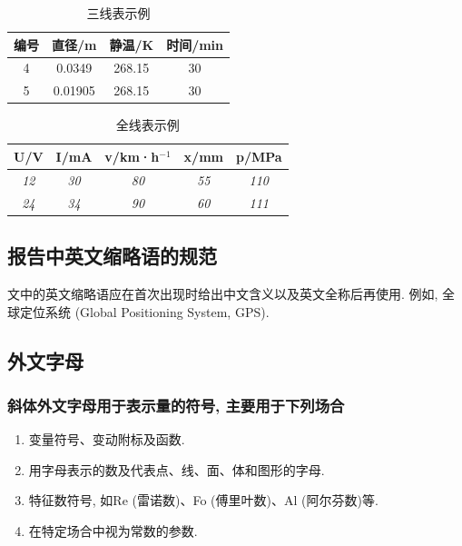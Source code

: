 \documentclass{urtemp}
\begin{document}
\begin{table}[h]
\centering
\caption{三线表示例} \label{tab:eg1}
\begin{tabular}{cccc}
\toprule
{编号} &  {直径}/\si{\metre} & {静温}/\si{\kelvin} & {时间}/min\\
\midrule 
4 & 0.0349 & 268.15 & 30\\
5 & 0.01905 & 268.15 & 30\\
\bottomrule
\end{tabular}
\end{table}

\begin{table}[h]
\centering
\caption{全线表示例} \label{tab:eg2}
\begin{tabular}{|c|c|c|c|c|}
\hline
U/V & I/mA & v/km·h$^{-1}$ & x/mm & p/MPa \\ \hline
\textit{12} & \textit{30} & \textit{80} & \textit{55} & \textit{110} \\ \hline
\textit{24} & \textit{34} & \textit{90} & \textit{60} & \textit{111} \\ \hline
\end{tabular}
\end{table}

\subsection{报告中英文缩略语的规范}
文中的英文缩略语应在首次出现时给出中文含义以及英文全称后再使用. 例如, 全球定位系统 (Global Positioning System, GPS). 


\subsection{外文字母}
\subsubsection{斜体外文字母用于表示量的符号, 主要用于下列场合}

\begin{enumerate}
\renewcommand{\labelenumi}{(\theenumi)}
\item 变量符号、变动附标及函数. 
\item 用字母表示的数及代表点、线、面、体和图形的字母. 
\item 特征数符号, 如Re (雷诺数)、Fo (傅里叶数)、Al (阿尔芬数)等. 
\item 在特定场合中视为常数的参数. 
\end{enumerate} 
\end{document}
